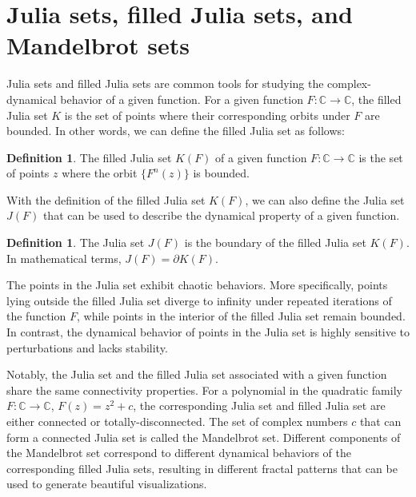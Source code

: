\documentclass{amsart}
\theoremstyle{plain}
\theoremstyle{definition}
\newtheorem{definition}[theorem]{Definition}
\theoremstyle{remark}
\numberwithin{equation}{section}
\newcommand{\C}{\mathbb{C}}
\begin{document}
\section{Julia sets, filled Julia sets, and Mandelbrot sets}
Julia sets and filled Julia sets are common tools for studying the complex-dynamical behavior of a given function. For a given function $F:\C\rightarrow \C$, the filled Julia set $K$ is the set of points where their corresponding orbits under $F$ are bounded. In other words, we can define the filled Julia set as follows:
\begin{definition}
    The filled Julia set $K(F)$ of a given function $F:\C\rightarrow \C$ is the set of points $z$ where the orbit $\{F^n(z)\}$ is bounded.
\end{definition}
 With the definition of the filled Julia set $K(F)$, we can also define the Julia set $J(F)$ that can be used to describe the dynamical property of a given function.
 \begin{definition}
 The Julia set $J(F)$ is the boundary of the filled Julia set $K(F)$. In mathematical terms, $J(F) = \partial K(F)$.
\end{definition}
The points in the Julia set exhibit chaotic behaviors. More specifically, points lying outside the filled Julia set diverge to infinity under repeated iterations of the function $F$, while points in the interior of the filled Julia set remain bounded. In contrast, the dynamical behavior of points in the Julia set is highly sensitive to perturbations and lacks stability. 

Notably, the Julia set and the filled Julia set associated with a given function share the same connectivity properties. For a polynomial in the quadratic family $F:\C\rightarrow\C$, $F(z) = z^2 + c$, the corresponding Julia set and filled Julia set are either connected or totally-disconnected. The set of complex numbers $c$ that can form a connected Julia set is called the Mandelbrot set. Different components of the Mandelbrot set correspond to different dynamical behaviors of the corresponding filled Julia sets, resulting in different fractal patterns that can be used to generate beautiful visualizations. 
\end{document}
